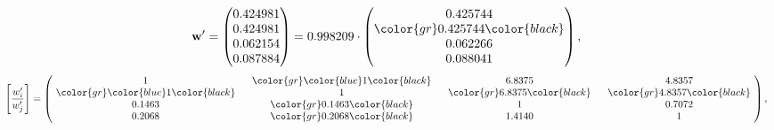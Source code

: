 \begin{example}
\begin{equation*}
\mathbf{w}^{\prime} =
\begin{pmatrix}
0.424981\\
0.424981\\
0.062154\\
0.087884
\end{pmatrix} =
0.998209\cdot
\begin{pmatrix}
0.425744\\
\color{gr} 0.425744\color{black} \\
0.062266\\
0.088041
\end{pmatrix},
\end{equation*}
\begin{equation*}
\left[ \frac{{w}^{\prime}_i}{{w}^{\prime}_j} \right] =
\begin{pmatrix}
$\,\,$ 1 $\,\,$ & $\,\,$\color{gr} \color{blue} 1\color{black} $\,\,$ & $\,\,$6.8375$\,\,$ & $\,\,$4.8357$\,\,$ \\
$\,\,$\color{gr} \color{blue} 1\color{black} $\,\,$ & $\,\,$ 1 $\,\,$ & $\,\,$\color{gr} 6.8375\color{black} $\,\,$ & $\,\,$\color{gr} 4.8357\color{black}   $\,\,$ \\
$\,\,$0.1463$\,\,$ & $\,\,$\color{gr} 0.1463\color{black} $\,\,$ & $\,\,$ 1 $\,\,$ & $\,\,$0.7072 $\,\,$ \\
$\,\,$0.2068$\,\,$ & $\,\,$\color{gr} 0.2068\color{black} $\,\,$ & $\,\,$1.4140$\,\,$ & $\,\,$ 1  $\,\,$ \\
\end{pmatrix},
\end{equation*}
\end{example}
\newpage
